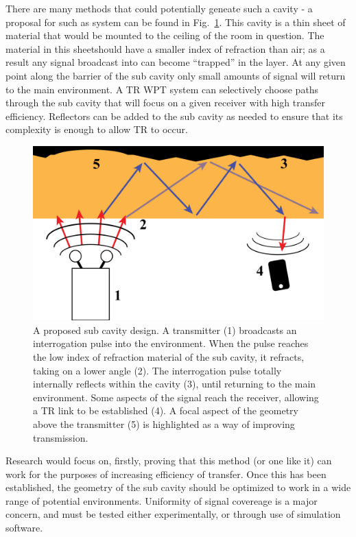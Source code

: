 There are many methods that could potentially geneate such a cavity - a proposal for such as system can be found in Fig.~\ref{fig:subCavity}. This cavity is a thin sheet of material that would be mounted to the ceiling of the room in question. The material in this sheetshould have a smaller index of refraction than air; as a result any signal broadcast into can become ``trapped'' in the layer. At any given point along the barrier of the sub cavity only small amounts of signal will return to the main environment. A TR WPT system can selectively choose paths through the sub cavity that will focus on a given receiver with high transfer efficiency. Reflectors can be added to the sub cavity as needed to ensure that its complexity is enough to allow TR to occur.

\begin{figure}[t]
\includegraphics[width=\columnwidth]{figs/future/subCavity}
\caption[Proposed ``Sub Cavity Design'']{A proposed sub cavity design. A transmitter (1) broadcasts an interrogation pulse into the environment. When the pulse reaches the low index of refraction material of the sub cavity, it refracts, taking on a lower angle (2). The interrogation pulse totally internally reflects within the cavity (3), until returning to the main environment. Some aspects of the signal reach the receiver, allowing a TR link to be established (4). A focal aspect of the geometry above the transmitter (5) is highlighted as a way of improving transmission.}
\label{fig:subCavity}
\end{figure}

Research would focus on, firstly, proving that this method (or one like it) can work for the purposes of increasing efficiency of transfer. Once this has been established, the geometry of the sub cavity should be optimized to work in a wide range of potential environments. Uniformity of signal covereage is a major concern, and must be tested either experimentally, or through use of simulation software.

